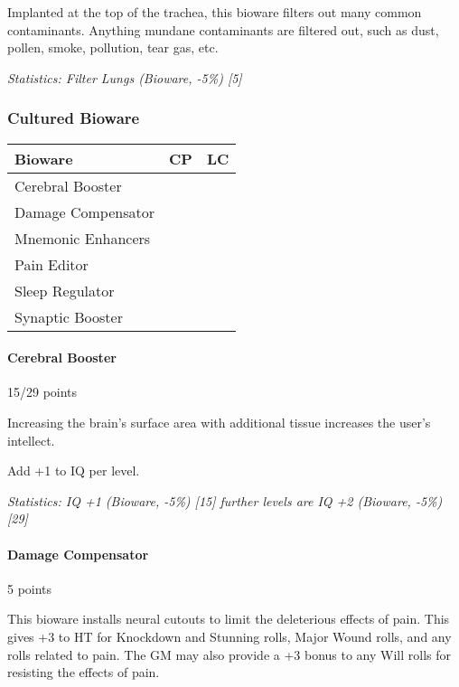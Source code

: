 \begin{multicols*}{3}
	Implanted at the top of the trachea, this bioware filters out many common contaminants. Anything mundane contaminants are filtered out, such as dust, pollen, smoke, pollution, tear gas, etc.
	
	\textit{\textcolor{OliveGreen}{Statistics: Filter Lungs (Bioware, -5\%) [5]}}
	
	\subsubsection{Cultured Bioware}
	
	\begin{center}
		\begin{tabularx}{0.32\textwidth}{|X|c|c|}
			\hline
			Bioware & CP & LC\\
			\hline
			\hline
			Cerebral Booster & & \\
			Damage Compensator & & \\
			Mnemonic Enhancers & & \\
			Pain Editor & & \\
			Sleep Regulator & & \\
			Synaptic Booster & & \\
			\hline
		\end{tabularx}
	\end{center}
	
	\paragraph{Cerebral Booster}
	\begin{flushright}
		15/29 points
	\end{flushright}
	
	Increasing the brain's surface area with additional tissue increases the user's intellect. 
	
	Add +1 to IQ per level. 
	
	\textit{\textcolor{OliveGreen}{Statistics: IQ +1 (Bioware, -5\%) [15] further levels are IQ +2 (Bioware, -5\%) [29]}}
	
	\paragraph{Damage Compensator}
	\begin{flushright}
		5 points
	\end{flushright}
	
	This bioware installs neural cutouts to limit the deleterious effects of pain. This gives +3 to HT for Knockdown and Stunning rolls, Major Wound rolls, and any rolls related to pain. The GM may also provide a +3 bonus to any Will rolls for resisting the effects of pain.
	

\end{multicols*}
